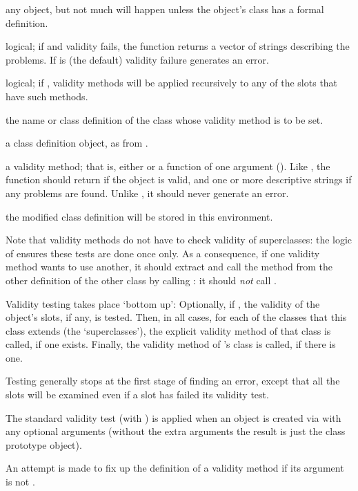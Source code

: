 %
\begin{Arguments}
\begin{ldescription}
\item[\code{object}]  any object, but not much will happen unless the
object's class has a formal definition.
\item[\code{test}] logical; if  and validity fails, the
function returns a vector of strings describing the problems.  If
 is  (the default) validity failure generates
an error.
\item[\code{complete}] logical; if , validity methods will be
applied recursively to any of the slots that have such methods.
\item[\code{Class}] the name or class definition of the class whose validity
method is to be set.
\item[\code{ClassDef}] a class definition object, as from
.
\item[\code{method}] a validity method;  that is, either  or a
function of one argument ().  Like
, the function should return  if the
object is valid, and one or more descriptive strings if any problems
are found.  Unlike , it should never generate an
error.

\item[\code{where}] the modified class definition will be stored in this
environment.

Note that validity methods do not have to check validity of
superclasses: the logic of  ensures these tests are
done once only.  As a consequence, if one validity method wants to use
another, it should extract and call the method from the other
definition of the other class by calling : it
should \emph{not} call .
\end{ldescription}
\end{Arguments}
%
\begin{Details}\relax
Validity testing takes place `bottom up': Optionally, if
, the validity of the object's slots, if any, is
tested.  Then, in all cases, for each of the classes that this class
extends (the `superclasses'), the explicit validity method of
that class is called, if one exists.  Finally, the validity method of
's class is called, if there is one.

Testing generally stops at the first stage of finding an error, except
that all the slots will be examined even if a slot has failed its
validity test.

The standard validity test (with ) is applied
when an object is created via  with any optional
arguments (without the extra arguments the result is just the class
prototype object).

An attempt is made to fix up the definition of a validity method if
its argument is not .
\end{Details}
